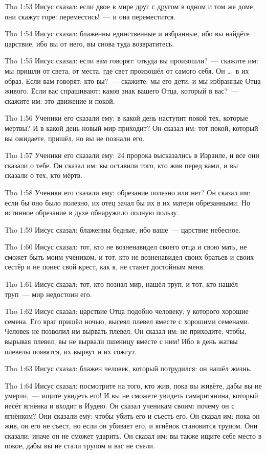 \vs Tho 1:53
Иисус сказал:
если двое в мире друг с другом в одном и том же доме,
они скажут горе: переместись!~--- и она переместится.

\vs Tho 1:54
Иисус сказал:
блаженны единственные и избранные, ибо вы найдёте царствие,
ибо вы от него, вы снова туда возвратитесь.

\vs Tho 1:55
Иисус сказал:
если вам говорят: откуда вы произошли?~--- скажите им:
мы пришли от света, от места,
где свет произошёл от самого себя.
Он \ldots\ в их образ.
Если вам говорят: кто вы?~--- скажите: мы его дети,
и мы избранные Отца живого.
Если вас спрашивают:
каков знак вашего Отца, который в вас?~--- скажите им:
это движение и покой.

\vs Tho 1:56
Ученики его сказали ему:
в какой день наступит покой тех, которые мертвы?
И в какой день новый мир приходит?
Он сказал им:
тот покой, который вы ожидаете, пришёл,
но вы не познали его.

\vs Tho 1:57
Ученики его сказали ему:
24 пророка высказались в Израиле, и все они сказали о тебе.
Он сказал им:
вы оставили того, кто жив перед вами, и вы сказали о тех, кто мёртв.

\vs Tho 1:58
Ученики его сказали ему:
обрезание полезно или нет?
Он сказал им:
если бы оно было полезно, их отец зачал бы их в их матери обрезанными.
Но истинное обрезание в духе обнаружило полную пользу.

\vs Tho 1:59
Иисус сказал: блаженны бедные, ибо ваше~--- царствие небесное.

\vs Tho 1:60
Иисус сказал:
тот, кто не возненавидел своего отца и свою мать,
не сможет быть моим учеником,
и тот, кто не возненавидел своих братьев и своих сестёр
и не понес свой крест, как я, не станет достойным меня.

\vs Tho 1:61
Иисус сказал:
тот, кто познал мир, нашёл труп,
и тот, кто нашёл труп~--- мир недостоин его.

\vs Tho 1:62
Иисус сказал:
царствие Отца подобно человеку, у которого хорошие семена.
Его враг пришёл ночью, высеял плевел вместе с хорошими семенами.
Человек не позволил им вырвать плевел.
Он сказал им:
не приходите, чтобы, вырывая плевел,
вы не вырвали пшеницу вместе с ним!
Ибо в день жатвы плевелы появятся, их вырвут и их сожгут.

\vs Tho 1:63
Иисус сказал: блажен человек, который потрудился: он нашёл жизнь.

\vs Tho 1:64
Иисус сказал:
посмотрите на того, кто жив, пока вы живёте,
дабы вы не умерли,~--- ищите увидеть его!
И вы не сможете увидеть самаритянина,
который несёт ягнёнка и входит в Иудею.
Он сказал ученикам своим: почему он с ягнёнком?
Они сказали ему: чтобы убить его и съесть его.
Он сказал им: пока он жив, он его не съест,
но если он убивает его, и ягнёнок становится трупом.
Они сказали: иначе он не сможет ударить.
Он сказал им: вы также ищите себе место в покое,
дабы вы не стали трупом и вас не съели.

